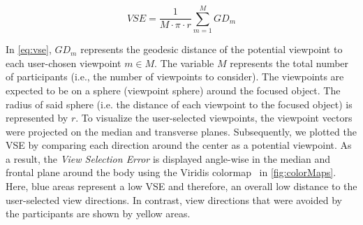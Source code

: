 \begin{equation}
	\label{eq:vse}
	VSE = \frac{1}{M \cdot \pi \cdot r}\sum_{m=1}^{M} GD_{m}
\end{equation}

In \autoref{eq:vse}, \(GD_m\) represents the geodesic distance of the potential viewpoint to each user-chosen viewpoint \(m \in M\). The variable $M$ represents the total number of participants (i.e., the number of viewpoints to consider). The viewpoints are expected to be on a sphere (viewpoint sphere) around the focused object. The radius of said sphere (i.e. the distance of each viewpoint to the focused object) is represented by $r$. To visualize the user-selected viewpoints, the viewpoint vectors were projected on the median and transverse planes. Subsequently, we plotted the VSE by comparing each direction around the center as a potential viewpoint. As a result, the \emph{View Selection Error} is displayed angle-wise in the median and frontal plane around the body using the Viridis colormap~\cite{viridis} in \autoref{fig:colorMaps}. Here, blue areas represent a low VSE and therefore, an overall low distance to the user-selected view directions. In contrast, view directions that were avoided by the participants are shown by yellow areas.

